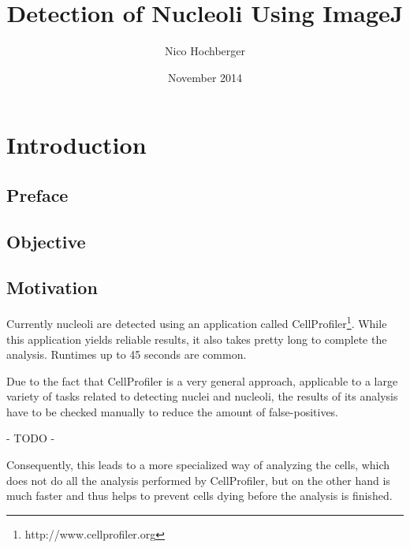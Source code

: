\documentclass[a4paper, 12pt]{article}
\begin{document}

\nocite{*}

\title{Detection of Nucleoli Using ImageJ}
\author{Nico Hochberger}
\date{November 2014}
\maketitle

\newpage
\tableofcontents

\newpage
\listoffigures

\newpage
\listoftables

\newpage
\section{Introduction}

\subsection{Preface}

\subsection{Objective}

\subsection{Motivation}
Currently nucleoli are detected using an application called
CellProfiler\footnote{http://www.cellprofiler.org}. While this application
yields reliable results, it also takes pretty long to complete the analysis.
Runtimes up to 45 seconds are common.

Due to the fact that CellProfiler is a very general approach, applicable to a
large variety of tasks related to detecting nuclei and nucleoli, the results of
its analysis have to be checked manually to reduce the amount of
false-positives.

- TODO -

Consequently, this leads to a more specialized way of analyzing the cells, which
does not do all the analysis performed by CellProfiler, but on the other hand is
much faster and thus helps to prevent cells dying before the analysis is
finished.
\end{document}
